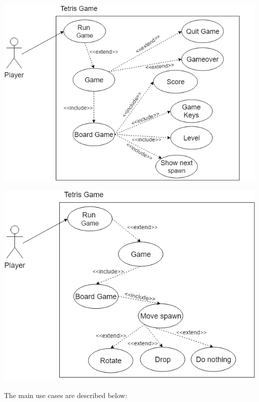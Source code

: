 \documentclass[a4paper]{article}
\begin{document}
\begin{center}
	\includegraphics[scale=0.55]{resources/img/use_cases1}
	\label{use-cases}
\end{center}

\begin{center}
	\includegraphics[scale=0.55]{resources/img/use_cases2}
\end{center}

The main use cases are described below: 
\end{document}
